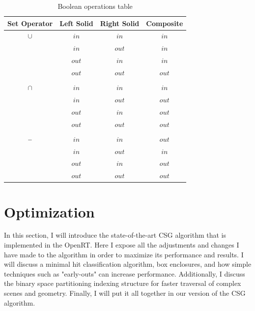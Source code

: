 \documentclass[a4paper,11pt,oneside]{article}
\newcommand{\minus}{\scalebox{0.9}[1.0]{$-$}} %
\begin{document}
\begin{table}[H]
	\centering
	\caption{Boolean operations table}
	\label{section3:boolean_algebra}
	\begin{tabular}{||c c c c||} 
		\hline
		Set Operator & Left Solid & Right Solid & Composite \\ [0.5ex] 
		\hline\hline
		$\cup$       & $in$       & $in$        & $in$      \\
		             & $in$       & $out$       & $in$      \\
		             & $out$      & $in$       & $in$      \\
		             & $out$      & $out$       & $out$     \\
		             &            &             &           \\
		$\cap$       & $in$       & $in$        & $in$      \\
		             & $in$       & $out$       & $out$     \\
		             & $out$      & $in$        & $out$     \\
		             & $out$      & $out$       & $out$     \\
		             &            &             &           \\
		$\minus$     & $in$       & $in$        & $out$     \\
		             & $in$       & $out$       & $in$      \\
		             & $out$      & $in$        & $out$     \\
		             & $out$      & $out$       & $out$     \\		 	   	
		\hline
	\end{tabular}
\end{table}

\section{Optimization}

In this section, I will introduce the state-of-the-art CSG algorithm that is implemented in the OpenRT. Here I expose all the adjustments and changes I have made to the algorithm in order to maximize its performance and results. I will discuss a minimal hit classification algorithm, box enclosures, and how simple techniques such as "early-outs" can increase performance. Additionally, I discuss the binary space partitioning indexing structure for faster traversal of complex scenes and geometry. Finally, I will put it all together in our version of the CSG algorithm.
\end{document}
